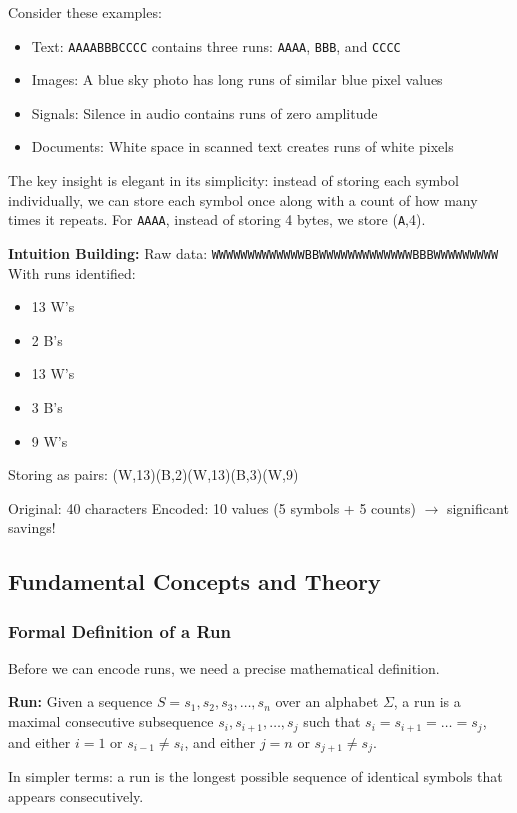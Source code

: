 Consider these examples:
\begin{itemize}
    \item Text: \texttt{AAAABBBCCCC} contains three runs: \texttt{AAAA}, \texttt{BBB}, and \texttt{CCCC}
    \item Images: A blue sky photo has long runs of similar blue pixel values
    \item Signals: Silence in audio contains runs of zero amplitude
    \item Documents: White space in scanned text creates runs of white pixels
\end{itemize}

The key insight is elegant in its simplicity: instead of storing each symbol individually, we can store each symbol once along with a count of how many times it repeats. For \texttt{AAAA}, instead of storing 4 bytes, we store (\texttt{A},4).

\begin{examplebox}
\textbf{Intuition Building:}
Raw data: \texttt{WWWWWWWWWWWWWBBWWWWWWWWWWWWWBBBWWWWWWWWW}
\newline
With runs identified: 
\begin{itemize}
    \item 13 W's
    \item 2 B's
    \item 13 W's
    \item 3 B's
    \item 9 W's
\end{itemize}
Storing as pairs: (W,13)(B,2)(W,13)(B,3)(W,9)

Original: 40 characters
Encoded: 10 values (5 symbols + 5 counts) $\rightarrow$ significant savings!
\end{examplebox}

\subsection{Fundamental Concepts and Theory}

\subsubsection{Formal Definition of a Run}

Before we can encode runs, we need a precise mathematical definition.

\begin{definitionbox}
\textbf{Run:} Given a sequence $S = s_1, s_2, s_3, \ldots, s_n$ over an alphabet $\Sigma$, a run is a maximal consecutive subsequence $s_i, s_{i+1}, \ldots, s_j$ such that $s_i = s_{i+1} = \ldots = s_j$, and either $i=1$ or $s_{i-1} \neq s_i$, and either $j=n$ or $s_{j+1} \neq s_j$.

In simpler terms: a run is the longest possible sequence of identical symbols that appears consecutively.
\end{definitionbox}


